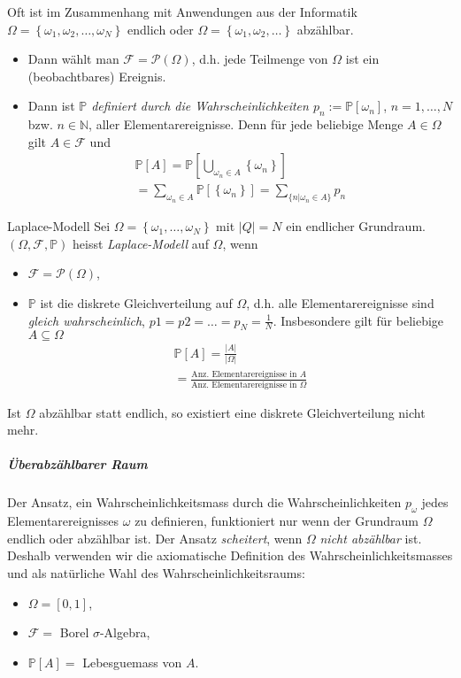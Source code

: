 \documentclass[a4paper,10pt]{article}
\def\N{\mathbb{N}}
\def\P{\mathbb{P}}
\begin{document}
Oft ist im Zusammenhang mit Anwendungen aus der Informatik \( \Omega = \left\{ \omega_1, \omega_2, \dots, \omega_N \right\} \) endlich oder \( \Omega = \left\{ \omega_1, \omega_2, \dots \right\} \) abzählbar.
\begin{itemize}
    \item Dann wählt man \( \mathcal{F} = \mathcal{P}(\Omega) \), d.h. jede Teilmenge von \( \Omega \) ist ein (beobachtbares) Ereignis.
    \item Dann ist \emph{\( \P \) definiert durch die Wahrscheinlichkeiten \( p_n := \P \left[ \omega_n \right] \)}, \( n = 1, \dots, N \) bzw. \( n \in \N \), aller Elementarereignisse. Denn für jede beliebige Menge \( A \in \Omega \) gilt \(A \in \mathcal{F} \) und
    \begin{multline*}
        \P[A] = \P \left[ \bigcup_{\omega_n \in A} \left\{ \omega_n \right\} \right] \\
        = \sum_{\omega_n \in A} \P \left[ \left\{ \omega_n \right\} \right] = \sum_{\{ n | \omega_n \in A \}} p_n
    \end{multline*}
\end{itemize}

\begin{mainbox}{Laplace-Modell}
    Sei \( \Omega = \left\{ \omega_1, \dots, \omega_N \right\} \) mit \( |Q| = N \) ein endlicher Grundraum. \( (\Omega, \mathcal{F}, \P) \) heisst \emph{Laplace-Modell} auf \( \Omega \), wenn
    \begin{itemize}
        \item \( \mathcal{F} = \mathcal{P}(\Omega) \),
        \item \( \P \) ist die diskrete Gleichverteilung auf \( \Omega \), d.h. alle Elementarereignisse sind \emph{gleich wahrscheinlich}, \( p1 = p2 = \dots = p_N = \frac{1}{N} \). Insbesondere gilt für beliebige \( A \subseteq \Omega \)
        \begin{multline*}
            \P[A] = \frac{|A|}{|\Omega|} \\
            = \frac{\text{Anz. Elementarereignisse in } A}{\text{Anz. Elementarereignisse in } \Omega}
        \end{multline*}
    \end{itemize}
\end{mainbox}

Ist \( \Omega \) abzählbar statt endlich, so existiert eine diskrete Gleichverteilung nicht mehr.

\subparagraph{Überabzählbarer Raum} Der Ansatz, ein Wahrscheinlichkeitsmass durch die Wahrscheinlichkeiten \( p_\omega \) jedes Elementarereignisses \( \omega \) zu definieren, funktioniert nur wenn der Grundraum \( \Omega \) endlich oder abzählbar ist. Der Ansatz \emph{scheitert}, wenn \( \Omega \) \emph{nicht abzählbar} ist. Deshalb verwenden wir die axiomatische Definition des Wahrscheinlichkeitsmasses und als natürliche Wahl des Wahrscheinlichkeitsraums:
\begin{itemize}
    \item \( \Omega = [0, 1] \),
    \item \( \mathcal{F} = \) Borel \( \sigma \)-Algebra,
    \item \( \P[A] = \) Lebesguemass von \( A \).
\end{itemize}
\end{document}
